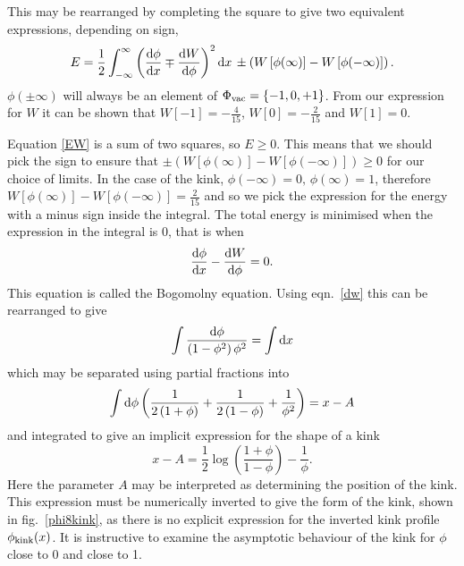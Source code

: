 \documentclass[11pt, oneside,titlepage]{article}  	%
\numberwithin{equation}{section}
\newcommand{\drv}{\ensuremath{\textup{d}}}
\begin{document}
 This may be rearranged by completing the square to give two equivalent expressions, depending on sign,
 \begin{equation}\label{energy_bogo}
E = \frac{1}{2} \int_{-\infty}^{\infty}\left (  \frac{\textup{d}\phi}{\textup{d}x} \mp \frac{\textup{d}W}{\textup{d}\phi} \right )^2 \drv x  \, \pm \left( W\left [  \phi(\infty)\right ]  -  W\left [  \phi(-\infty)\right ]\right).
 \end{equation}
$\phi(\pm\infty)$ will always be an element of $\Phi_{\textup{vac}} = \left \{ -1,0,+1\right \}$. From our expression for $W$ it can be shown that $W[-1] = -\frac{4}{15}$, $W[0] = -\frac{2}{15}$ and $W[1] = 0$.\par
 Equation \ref{EW} is a sum of two squares, so $E\geqslant 0$. This means that we should pick the sign to ensure that $ \pm \left( W\left [  \phi(\infty)\right ]  -  W\left [  \phi(-\infty)\right ]\right) \geqslant 0$ for our choice of limits. In the case of the kink, $\phi(-\infty) = 0,\, \phi(\infty) = 1 $, therefore $W\left [  \phi(\infty)\right ]  -  W\left [  \phi(-\infty)\right ] = \frac{2}{15}$ and so we pick the expression for the energy with a minus sign inside the integral. The total energy is minimised when the expression in the integral is 0, that is when
 \begin{equation}\label{bogo}
 \frac{\textup{d}\phi}{\textup{d}x} - \frac{\textup{d}W}{\textup{d}\phi} = 0.
 \end{equation}
 This equation is called the Bogomolny equation. Using eqn.~\ref{dw} this can be rearranged to give
 \begin{equation}
 \int \frac{\drv\phi}{\left(1-\phi^2 \right ) \phi^2} = \int \drv x
 \end{equation}
 which may be separated using partial fractions into
 \begin{equation}
 \int\drv\phi \left (\frac{1}{2\left(1+\phi\right )} + \frac{1}{2\left(1-\phi\right )} + \frac{1}{\phi^2} \right) = x -A
 \end{equation}
 and integrated to give an implicit expression for the shape of a kink
 \begin{equation}\label{long_kink_eq}
 x-A = \frac{1}{2}\log\left (\frac{1+\phi}{1-\phi} \right ) - \frac{1}{\phi}.
 \end{equation}
 Here the parameter $A$ may be interpreted as determining the position of the kink. This expression must be numerically inverted to give the form of the kink, shown in fig.~\ref{phi8kink}, as there is no explicit expression for the inverted kink profile $\phi_\textup{kink}(x)$. It is instructive to examine the asymptotic behaviour of the kink for $\phi$ close to 0 and close to 1. \par
\end{document}
